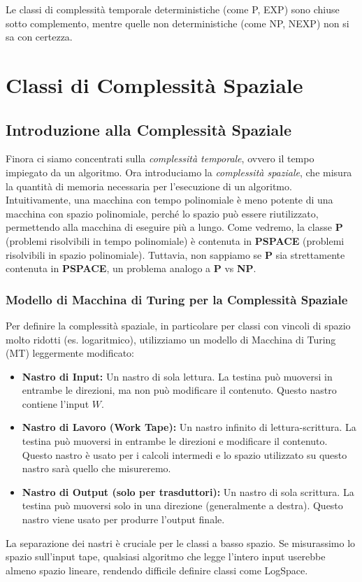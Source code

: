 \documentclass[a4paper, 11pt]{book} %
\theoremstyle{definition}
\begin{document}
Le classi di complessità temporale deterministiche (come P, EXP) sono chiuse sotto complemento, mentre quelle non deterministiche (come NP, NEXP) non si sa con certezza.



\chapter{Classi di Complessità Spaziale}



\section{Introduzione alla Complessità Spaziale}

Finora ci siamo concentrati sulla \emph{complessità temporale}, ovvero il tempo impiegato da un algoritmo. Ora introduciamo la \emph{complessità spaziale}, che misura la quantità di memoria necessaria per l'esecuzione di un algoritmo.
Intuitivamente, una macchina con tempo polinomiale è meno potente di una macchina con spazio polinomiale, perché lo spazio può essere riutilizzato, permettendo alla macchina di eseguire più a lungo.
Come vedremo, la classe \textbf{P} (problemi risolvibili in tempo polinomiale) è contenuta in \textbf{PSPACE} (problemi risolvibili in spazio polinomiale). Tuttavia, non sappiamo se \textbf{P} sia strettamente contenuta in \textbf{PSPACE}, un problema analogo a \textbf{P} vs \textbf{NP}.

\subsection{Modello di Macchina di Turing per la Complessità Spaziale}

Per definire la complessità spaziale, in particolare per classi con vincoli di spazio molto ridotti (es. logaritmico), utilizziamo un modello di Macchina di Turing (MT) leggermente modificato:
\begin{itemize}
    \item \textbf{Nastro di Input:} Un nastro di sola lettura. La testina può muoversi in entrambe le direzioni, ma non può modificare il contenuto. Questo nastro contiene l'input $W$.
    \item \textbf{Nastro di Lavoro (Work Tape):} Un nastro infinito di lettura-scrittura. La testina può muoversi in entrambe le direzioni e modificare il contenuto. Questo nastro è usato per i calcoli intermedi e lo spazio utilizzato su questo nastro sarà quello che misureremo.
    \item \textbf{Nastro di Output (solo per trasduttori):} Un nastro di sola scrittura. La testina può muoversi solo in una direzione (generalmente a destra). Questo nastro viene usato per produrre l'output finale.
\end{itemize}
La separazione dei nastri è cruciale per le classi a basso spazio. Se misurassimo lo spazio sull'input tape, qualsiasi algoritmo che legge l'intero input userebbe almeno spazio lineare, rendendo difficile definire classi come LogSpace.
\end{document}
